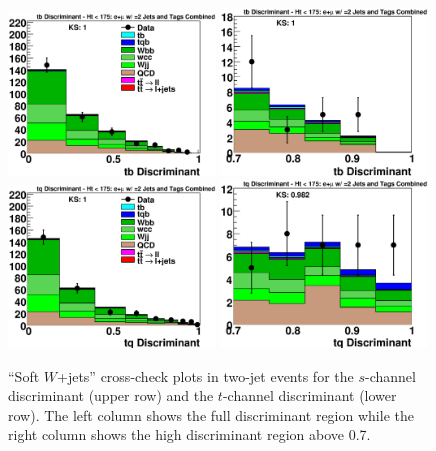 \clearpage
\begin{figure}[!h!tbp]
\includegraphics[width=0.49\textwidth]
{eps/MatrixElement/cross_check/combined/2jet/Wjets_tb_Discriminant}
\includegraphics[width=0.49\textwidth]
{eps/MatrixElement/cross_check/combined/2jet/Wjets_tb_Discriminant_Zoom}
\includegraphics[width=0.49\textwidth]
{eps/MatrixElement/cross_check/combined/2jet/Wjets_tq_Discriminant}
\includegraphics[width=0.49\textwidth]
{eps/MatrixElement/cross_check/combined/2jet/Wjets_tq_Discriminant_Zoom}
\vspace{-0.1in}
\caption{``Soft $W$+jets'' cross-check plots in two-jet
events for the $s$-channel discriminant (upper row) and the $t$-channel discriminant
(lower row). The left column shows the full discriminant region while
the right column shows the high discriminant region above 0.7.}
\label{wjets-cross-2jet}
\end{figure}

